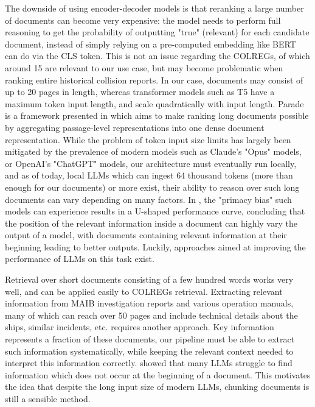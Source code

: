 \documentclass[10pt]{reportMaster}
\begin{document}
The downside of using encoder-decoder models is that reranking a large number of documents can become very expensive: the model needs to perform full reasoning to get the probability of outputting "true" (relevant) for each candidate document, instead of simply relying on a pre-computed embedding like BERT can do via the CLS token. This is not an issue regarding the COLREGs, of which around 15 are relevant to our use case, but may become problematic when ranking entire historical collision reports. In our case, documents may consist of up to 20 pages in length, whereas transformer models such as T5 have a maximum token input length, and scale quadratically with input length. Parade is a framework presented in \cite{li2021paradepassagerepresentationaggregation} which aims to make ranking long documents possible by aggregating passage-level representations into one dense document representation. While the problem of token input size limits has largely been mitigated by the prevalence of modern models such as Claude's "Opus" models, or OpenAI's "ChatGPT" models, our architecture must eventually run locally, and as of today, local LLMs which can ingest 64 thousand tokens (more than enough for our documents) or more exist, their ability to reason over such long documents can vary depending on many factors\cite{liu2023lostmiddlelanguagemodels}. In \cite{liu2023lostmiddlelanguagemodels}, the "primacy bias" such models can experience results in a U-shaped performance curve, concluding that the position of the relevant information inside a document can highly vary the output of a model, with documents containing relevant information at their beginning leading to better outputs. Luckily, approaches aimed at improving the performance of LLMs on this task exist.

Retrieval over short documents consisting of a few hundred words works very well, and can be applied easily to COLREGs retrieval. Extracting relevant information from MAIB investigation reports and various operation manuals, many of which can reach over 50 pages and include technical details about the ships, similar incidents, etc. requires another approach. Key information represents a fraction of these documents, our pipeline must be able to extract such information systematically, while keeping the relevant context needed to interpret this information correctly. \cite{liu2023lostmiddlelanguagemodels} showed that many LLMs struggle to find information which does not occur at the beginning of a document. This motivates the idea that despite the long input size of modern LLMs, chunking documents is still a sensible method. 
\end{document}
